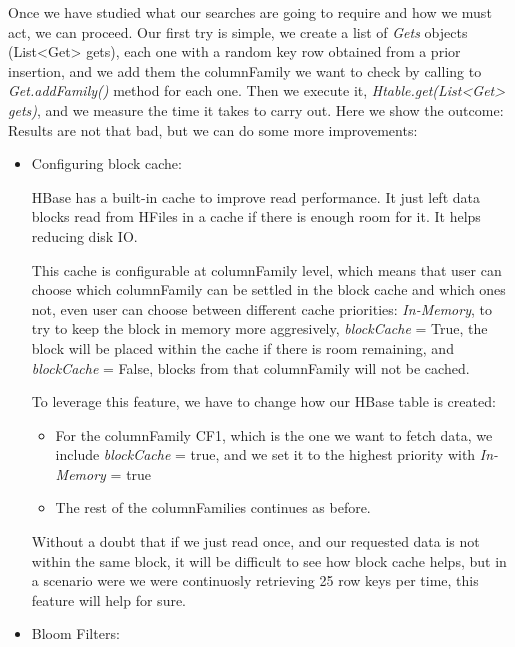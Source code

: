 Once we have studied what our searches are going to require and how we must act, we can proceed. Our first try is simple, we create a list of \textit{Gets} objects (List<Get> gets), each one with a random key row obtained from a prior insertion, and we add them the columnFamily we want to check by calling to \textit{Get.addFamily()} method for each one. Then we execute it, \textit{Htable.get(List<Get> gets)}, and we measure the time it takes to carry out.
\bigskip
Here we show the outcome:
\bigskip
Results are not that bad, but we can do some more improvements:
\begin{itemize}
\item Configuring block cache:
\par 
HBase has a built-in cache to improve read performance. It just left data blocks read from HFiles in a cache if there is enough room for it. It helps reducing disk IO.
\par
 This cache is configurable at columnFamily level, which means that user can choose which columnFamily can be settled in the block cache and which ones not, even user can choose between different cache priorities: \textit{In-Memory}, to try to keep the block in memory more aggresively, \textit{blockCache} = True, the block will be placed within the cache if there is room remaining, and \textit{blockCache} = False, blocks from that columnFamily will not be cached.
\par 
To leverage this feature, we have to change how our HBase table is created: 
\begin{itemize}
\item For the columnFamily CF1, which is the one we want to fetch data, we include \textit{blockCache} = true, and we set it to the highest priority with \textit{In-Memory} = true
\item The rest of the columnFamilies continues as before.
\end{itemize}

Without a doubt that if we just read once, and our requested data is not within the same block, it will be difficult to see how block cache helps, but in a scenario were we were continuosly retrieving 25 row keys per time, this feature will help for sure.


\item Bloom Filters:


\end{itemize}
